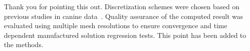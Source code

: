\documentclass[letterpaper,12pt]{report}
\newcommand{\picdir}{pdffig}
\begin{document}
\begin{itemize}
{\color{red}
Thank you for pointing this out. Discretization schemes were chosen based on
previous studies in canine data~\cite{fuentesetal11a}. 
Quality assurance of the computed result was evaluated using multiple mesh
resolutions to ensure convergence and time dependent manufactured solution
regression tests.  This point has been added to the methods.



}
\end{itemize}
\end{document}
